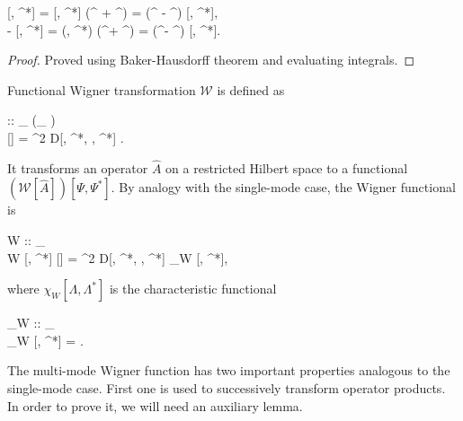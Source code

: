 \begin{lemma}
\label{lmm:func-wigner:displacement-derivatives}
	\begin{eqn*}
		\frac{\delta}{\delta \Lambda^\prime} [\Lambda, \Lambda^*]
		= [\Lambda, \Lambda^*] (\Psiop^{\prime\dagger} +  \Lambda^{\prime*})
		= (\Psiop^{\prime\dagger} -  \Lambda^{\prime*}) [\Lambda, \Lambda^*], \\
		-\frac{\delta}{\delta \Lambda^{\prime*}} [\Lambda, \Lambda^*]
		= (\Lambda, \Lambda^*) (\Psiop^\prime +  \Lambda^\prime)
		= (\Psiop^\prime -  \Lambda^\prime) [\Lambda, \Lambda^*].
	\end{eqn*}
\end{lemma}
\begin{proof}
Proved using Baker-Hausdorff theorem and evaluating integrals.
\end{proof}

\begin{definition}
\label{eqn:func-wigner:w-transformation}
	Functional Wigner transformation $\mathcal{W}$ is defined as
	\begin{eqn*}
		 :: _{\restbasis} \rightarrow (_{\restbasis} \rightarrow \mathbb{C}) \\
		[\hat{A}]
		=  \int \delta^2 \Lambda
			D[\Lambda, \Lambda^*, \Psi, \Psi^*]
			\Trace{ \hat{A} \hat{D}[\Lambda, \Lambda^*] }.
	\end{eqn*}
	It transforms an operator $\hat{A}$ on a restricted Hilbert space to a functional $(\mathcal{W}[\hat{A}])[\Psi, \Psi^*]$.
	By analogy with the single-mode case, the Wigner functional is
	\begin{eqn*}
		W :: _{\restbasis} \rightarrow \mathbb{C} \\
		W [\Psi, \Psi^*]
		\equiv {}[\hat{\rho}]
		=  \int \delta^2 \Lambda
			D[\Lambda, \Lambda^*, \Psi, \Psi^*]
			\chi_W [\Lambda, \Lambda^*],
	\end{eqn*}
	where $\chi_W [\Lambda, \Lambda^*]$ is the characteristic functional
	\begin{eqn*}
		\chi_W :: _{\restbasis} \rightarrow \mathbb{R} \\
		\chi_W [\Lambda, \Lambda^*]
		= \Trace{ \hat{\rho} \hat{D}[\Lambda, \Lambda^*] }.
	\end{eqn*}
\end{definition}

The multi-mode Wigner function has two important properties analogous to the single-mode case.
First one is used to successively transform operator products.
In order to prove it, we will need an auxiliary lemma.

